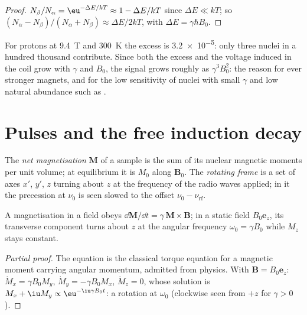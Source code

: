 \begin{proof}
$N_\beta/N_\alpha = \eu^{-\Delta E/kT} \approx 1 - \Delta E/kT$ since $\Delta E \ll kT$; so
$(N_\alpha - N_\beta)/(N_\alpha + N_\beta) \approx \Delta E/2kT$, with $\Delta E = \gamma\hbar B_0$.
\end{proof}

For protons at \qty{9.4}{T} and \qty{300}{K} the excess is \num{3.2e-5}: only
three nuclei in a hundred thousand contribute. Since both the excess and the
voltage induced in the coil grow with $\gamma$ and $B_0$, the signal grows
roughly as $\gamma^3B_0^2$: the reason for ever stronger magnets, and for the low
sensitivity of nuclei with small $\gamma$ and low natural abundance such as
.

\section{Pulses and the free induction decay}

\begin{definition}\label{def:b3:advanced-nmr:magnetisation}
The \emph{net magnetisation} $\mathbf M$ of a sample is the
sum of its nuclear magnetic moments per unit volume; at equilibrium it is
$M_0$ along $\mathbf B_0$. The \emph{rotating frame} is a set
of axes $x'$, $y'$, $z$ turning about $z$ at the frequency of the radio waves
applied; in it the precession at $\nu_0$ is seen slowed to the offset $\nu_0 -
\nu_{\mathrm{rf}}$.
\end{definition}

\begin{proposition}[Precession]\label{prop:b3:advanced-nmr:precession}
A magnetisation in a field obeys $\dd\mathbf M/\dd t = \gamma\,\mathbf M\times\mathbf B$; in a
static field $B_0\mathbf e_z$, its transverse component turns about $z$ at the angular
frequency $\omega_0 = \gamma B_0$ while $M_z$ stays constant.
\end{proposition}

\begin{proof}[Partial proof]
The equation is the classical torque equation for a magnetic moment carrying
angular momentum, admitted from physics. With $\mathbf B = B_0\mathbf e_z$: $\dot M_x = \gamma
B_0M_y$, $\dot M_y = -\gamma B_0M_x$, $\dot M_z = 0$, whose solution is $M_x + \iu M_y \propto
\eu^{-\iu\gamma B_0t}$: a rotation at $\omega_0$ (clockwise seen from $+z$ for $\gamma > 0$).
\end{proof}


